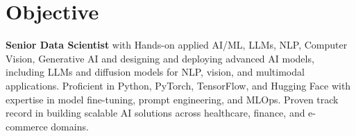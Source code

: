 \vspace{-8pt}
\section*{Objective}
\vspace{-20pt}

\noindent\textbf{Senior Data Scientist} with Hands-on applied AI/ML, LLMs, NLP, Computer Vision,
Generative AI and designing and deploying advanced AI models, including LLMs and diffusion models
for NLP, vision, and multimodal applications. Proficient in Python, PyTorch, TensorFlow, and Hugging
Face with expertise in model fine-tuning, prompt engineering, and MLOps. Proven track record in
building scalable AI solutions across healthcare, finance, and e-commerce domains.
